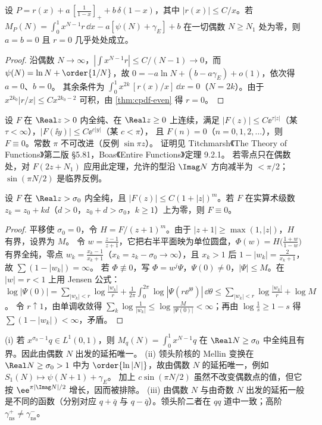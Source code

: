 \begin{proposition}[领头阶核由偶数矩唯一确定]\tagR\label{prop:cpdf-kernel-unique}
设 $P=r(x)+a\,[\frac{1}{1-x}]_++b\,\delta(1-x)$，其中 $|r(x)|\le C/x$。若
$M_P(N)=\int_0^1x^{N-1}r\,\dd x-a[\psi(N)+\gamma_E]+b$ 在一切偶数 $N\ge N_1$ 处为零，则 $a=b=0$ 且 $r=0$ 几乎处处成立。
\end{proposition}
\begin{proof}
沿偶数 $N\to\infty$，$|\int x^{N-1}r|\le C/(N-1)\to0$，而 $\psi(N)=\ln N+\order{1/N}$，故 $0=-a\ln N+(b-a\gamma_E)+o(1)$，依次得 $a=0$、$b=0$。
其余条件为 $\int_0^1x^{2k}\,[r(x)/x]\,\dd x=0$（$N=2k$）。由于 $x^{2k_0}|r/x|\le Cx^{2k_0-2}$ 可积，由 \cref{thm:cpdf-even} 得 $r=0$。
\end{proof}

\begin{theorem}[Carlson 1914]\label{thm:cpdf-carlson}
设 $F$ 在 $\Real z>0$ 内全纯、在 $\Real z\ge0$ 上连续，满足 $|F(z)|\le C\ee^{\tau|z|}$（某 $\tau<\infty$），$|F(\ii y)|\le C\ee^{c|y|}$（某 $c<\pi$），
且 $F(n)=0$（$n=0,1,2,\dots$），则 $F\equiv0$。常数 $\pi$ 不可改进（反例 $\sin\pi z$）。
证明见 Titchmarsh《The Theory of Functions》第二版 §5.81，Boas《Entire Functions》定理 9.2.1。
若零点只在偶数处，对 $F(2z+N_1)$ 应用此定理，允许的型沿 $\Imag N$ 方向减半为 $<\pi/2$；$\sin(\pi N/2)$ 是临界反例。
\end{theorem}

\begin{proposition}[对矩足够的版本]\tagR\label{prop:cpdf-poly}
设 $F$ 在 $\Real z>\sigma_0$ 内全纯，且 $|F(z)|\le C(1+|z|)^m$。若 $F$ 在实算术级数 $z_k=z_0+kd$（$d>0$，$z_0+d>\sigma_0$，$k\ge1$）上为零，则 $F\equiv0$。
\end{proposition}
\begin{proof}
平移使 $\sigma_0=0$，令 $H=F/(z+1)^m$。由于 $|z+1|\ge\max(1,|z|)$，$H$ 有界，设界为 $M$。
令 $w=\frac{z-1}{z+1}$，它把右半平面映为单位圆盘，$\Phi(w)=H\big(\frac{1+w}{1-w}\big)$ 有界全纯，零点
$w_k=\frac{x_k-1}{x_k+1}$（$x_k=z_k-\sigma_0\to\infty$），且 $x_k>1$ 后 $1-|w_k|=\frac{2}{x_k+1}$，故 $\sum(1-|w_k|)=\infty$。
若 $\Phi\not\equiv0$，写 $\Phi=w^j\Psi$，$\Psi(0)\ne0$，$|\Psi|\le M$。在 $|w|=r<1$ 上用 Jensen 公式：
$\log|\Psi(0)|=\sum_{|w_k|<r}\log\frac{|w_k|}{r}+\frac{1}{2\pi}\int_0^{2\pi}\log|\Psi(r\ee^{\ii\theta})|\,\dd\theta\le\sum_{|w_k|<r}\log\frac{|w_k|}{r}+\log M$。
令 $r\uparrow1$，由单调收敛得 $\sum_k\log\frac{1}{|w_k|}\le\log\frac{M}{|\Psi(0)|}<\infty$；再由 $\log\frac1s\ge1-s$ 得 $\sum(1-|w_k|)<\infty$，矛盾。
\end{proof}

\begin{corollary}[矩与反常维度的延拓]\label{cor:cpdf-continuation}
(i) 若 $x^{\sigma_0-1}q\in L^1(0,1)$，则 $M_q(N)=\int_0^1x^{N-1}q$ 在 $\Real N\ge\sigma_0$ 中全纯且有界。因此由偶数 $N$ 出发的延拓唯一。
(ii) 领头阶核的 Mellin 变换在 $\Real N\ge\sigma_0>1$ 中为 $\order{\ln|N|}$，故由偶数 $N$ 的延拓唯一，例如 $S_1(N)\mapsto\psi(N+1)+\gamma_E$。
加上 $c\sin(\pi N/2)$ 虽然不改变偶数点的值，但它按 $\ee^{\pi|\Imag N|/2}$ 增长，因而被排除。
(iii) 由偶数 $N$ 与由奇数 $N$ 出发的延拓一般是{\heiti 不同}的函数（分别对应 $q+\bar q$ 与 $q-\bar q$）。领头阶二者在 $qq$ 道中一致；高阶 $\gamma^+_{\mathrm{ns}}\ne\gamma^-_{\mathrm{ns}}$。
\end{corollary}
